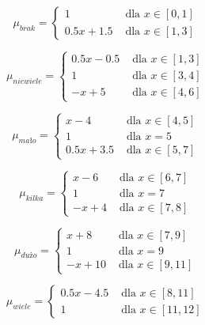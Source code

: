 \documentclass{classrep}
\begin{document}
\begin{enumerate}
  \begin{equation}
    \mu_{brak} =
      \begin{cases}
        1 & \text{ dla } x \in [0,1] \\
        0.5x+1.5  & \text{ dla } x \in [1,3]
      \end{cases}  
  \end{equation} 

  \begin{equation}
    \mu_{niewiele} =
      \begin{cases}
        0.5x-0.5 & \text{ dla } x \in [1,3] \\
        1 & \text{ dla } x \in [3,4] \\
        -x+5  & \text{ dla } x \in [4,6]
      \end{cases}  
  \end{equation}
  
  \begin{equation}
    \mu_{mało} =
      \begin{cases}
        x-4 & \text{ dla } x \in [4,5] \\
        1 & \text{ dla } x =5 \\
        0.5x+3.5  & \text{ dla } x \in [5,7]
      \end{cases}  
  \end{equation}

  \begin{equation}
    \mu_{kilka} =
      \begin{cases}
        x-6 & \text{ dla } x \in [6,7] \\
        1 & \text{ dla } x =7 \\
        -x+4  & \text{ dla } x \in [7,8]
      \end{cases}  
  \end{equation}
  
  \begin{equation}
    \mu_{dużo} =
      \begin{cases}
        x+8 & \text{ dla } x \in [7,9] \\
        1 & \text{ dla } x =9 \\
        -x+10  & \text{ dla } x \in [9,11]
      \end{cases}  
  \end{equation}

  \begin{equation}
    \mu_{wiele} =
      \begin{cases}
        0.5x-4.5 & \text{ dla } x \in [8,11] \\
        1 & \text{ dla } x \in [11,12]
      \end{cases}  
  \end{equation}


\end{enumerate}
\end{document}
